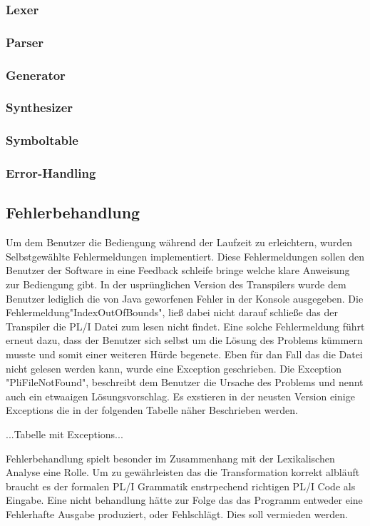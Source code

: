 \subsubsection{Lexer}
\subsubsection{Parser}
\subsubsection{Generator}
\subsubsection{Synthesizer}
\subsubsection{Symboltable}
\subsubsection{Error-Handling}

\subsection{Fehlerbehandlung}
Um dem Benutzer die Bediengung während der Laufzeit zu erleichtern, wurden Selbstgewählte Fehlermeldungen implementiert. Diese Fehlermeldungen sollen den Benutzer der Software in eine Feedback schleife bringe welche klare Anweisung zur Bediengung gibt. In der usprünglichen Version des Transpilers wurde dem Benutzer lediglich die von Java geworfenen Fehler in der Konsole ausgegeben. Die Fehlermeldung"IndexOutOfBounds", ließ dabei nicht darauf schließe das der Transpiler die PL/I Datei zum lesen nicht findet. Eine solche Fehlermeldung führt erneut dazu, dass der Benutzer sich selbst um die Lösung des Problems kümmern musste und somit einer weiteren Hürde begenete.
Eben für dan Fall das die Datei nicht gelesen werden kann, wurde eine Exception geschrieben. Die Exception "PliFileNotFound", beschreibt dem Benutzer die Ursache des Problems und nennt auch ein etwaaigen Lösungsvorschlag. Es exstieren in der neusten Version einige Exceptions die in der folgenden Tabelle näher Beschrieben werden.

...Tabelle mit Exceptions...

Fehlerbehandlung spielt besonder im Zusammenhang mit der Lexikalischen Analyse eine Rolle. Um zu gewährleisten das die Transformation korrekt albläuft braucht es der formalen PL/I Grammatik enstrpechend richtigen PL/I Code als Eingabe. Eine nicht behandlung hätte zur Folge das das Programm entweder eine Fehlerhafte Ausgabe produziert, oder Fehlschlägt. Dies soll vermieden werden.


